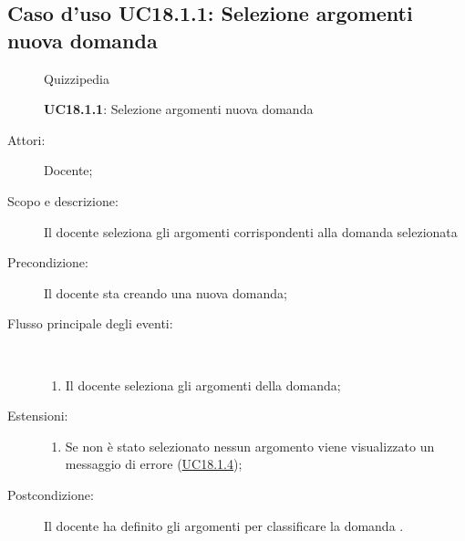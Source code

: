 \subsection{Caso d'uso UC18.1.1: Selezione argomenti nuova domanda}
\begin{figure}[H]
	\centering
	\begin{resizedtikzpicture}{\textwidth}
		\begin{umlsystem}[x=0, fill=lightgray!20]{Quizzipedia}
		\end{umlsystem}
	\end{resizedtikzpicture}
	\caption{\textbf{UC18.1.1}: Selezione argomenti nuova domanda}
	\label{UC18.1.1}
\end{figure}
\begin{description}
	\item[Attori:] Docente;
	\item[Scopo e descrizione:] Il docente seleziona gli argomenti corrispondenti alla domanda selezionata
	\item[Precondizione:] Il docente sta creando una nuova domanda;
	
	\item[Flusso principale degli eventi:] \ 
	\begin{enumerate}
		\item Il docente seleziona gli argomenti della domanda;
		
	\end{enumerate}
	\item[Estensioni:]
	\begin{enumerate}
		\item Se non è stato selezionato nessun argomento viene visualizzato un messaggio di errore (\hyperlink{UC18.1.4}{UC18.1.4});
		
	\end{enumerate}
	\item[Postcondizione:] Il docente ha definito gli argomenti per classificare la domanda
	.
\end{description}
\hypertarget{UC18.1.2}{}
